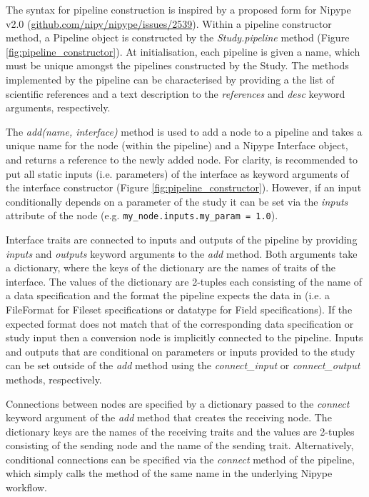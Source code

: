 \documentclass[smallextended]{svjour3}       %
\begin{document}
The syntax for pipeline construction is inspired by a proposed form for Nipype v2.0
(\url{github.com/nipy/nipype/issues/2539}).
Within a pipeline constructor method, a Pipeline object is constructed by the \emph{Study.pipeline} method
(Figure \ref{fig:pipeline_constructor}). At initialisation, each pipeline is given a name,
which must be unique amongst the pipelines constructed by the Study. The methods implemented
by the pipeline can be characterised by providing a the list of scientific references
and a text description to the \emph{references} and \emph{desc} keyword arguments, respectively.

The \emph{add(name, interface)} method is used to add a node to a pipeline and takes
a unique name for the node (within the pipeline) and a Nipype Interface object, and returns
a reference to the newly added node. For clarity, is recommended to put all static inputs
(i.e. parameters) of the interface as keyword arguments of the interface constructor
(Figure \ref{fig:pipeline_constructor}). However, if an input conditionally depends on a parameter of the
study it can be set via the \emph{inputs} attribute of the node (e.g. \lstinline{my_node.inputs.my_param = 1.0}).

Interface traits are connected to inputs and outputs of the pipeline by
providing \emph{inputs} and \emph{outputs} keyword arguments to the \emph{add} method. Both
arguments take a dictionary, where the keys of the dictionary are the names of traits of the interface. The
values of the dictionary are 2-tuples each consisting of the name of a data specification
and the format the pipeline expects the data in (i.e. a FileFormat for Fileset specifications or datatype
for Field specifications). If the expected format does not match that of the corresponding data specification
or study input then a conversion node is implicitly connected to the pipeline.
Inputs and outputs that are conditional on parameters or inputs provided to the
study can be set outside of the \emph{add} method using the \emph{connect\_input} or
\emph{connect\_output} methods, respectively.

Connections between nodes are specified by a dictionary
passed to the \emph{connect} keyword argument of the \emph{add} method
that creates the receiving node. The dictionary keys are the names of the
receiving traits and the values are 2-tuples
consisting of the sending node and the name of the sending trait. Alternatively,
conditional connections can be specified via the \emph{connect} method of the
pipeline, which simply calls the method of the same name in the underlying
Nipype workflow.
\end{document}

